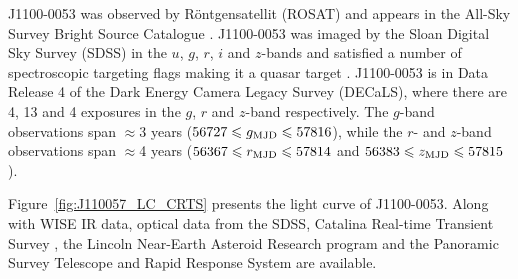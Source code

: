 \documentclass[a4paper,fleqn,usenatbib]{mnras}
\begin{document}
J1100-0053 was observed by R\"{o}ntgensatellit (ROSAT) and appears in
the All-Sky Survey Bright Source Catalogue \citep[RASS-BSC;
][]{Appenzeller1998, Voges1999}.  J1100-0053 was imaged by the Sloan
Digital Sky Survey (SDSS) in the $u$, $g$, $r$, $i$ and $z$-bands and
satisfied a number of spectroscopic targeting flags making it a quasar
target \citep{Richards2002}.  J1100-0053 is in Data Release 4
\citep[DR4; ][]{Dey2018} of the Dark Energy Camera Legacy Survey
(DECaLS), where there are 4, 13 and 4 exposures in the $g$, $r$ and
$z$-band respectively. The $g$-band observations span $\approx$3 years
($56727 \leq g_{\rm MJD} \leq 57816$), while the $r$- and $z$-band
observations span $\approx$4 years ($56367 \leq r_{\rm MJD} \leq
57814$ and $56383 \leq z_{\rm MJD} \leq 57815$).

Figure~\ref{fig:J110057_LC_CRTS} presents the light curve of
J1100-0053.  Along with WISE IR data, optical data from the SDSS,
Catalina Real-time Transient Survey \citep[CRTS;][]{Drake2009,
Mahabal2011}, the Lincoln Near-Earth Asteroid Research \citep[LINEAR;
][]{Sesar2011} program and the Panoramic Survey Telescope and Rapid
Response System \citep[PanSTARRS;][]{Kaiser2010, Stubbs2010,
Tonry2012, Magnier2013} are available.
\end{document}
